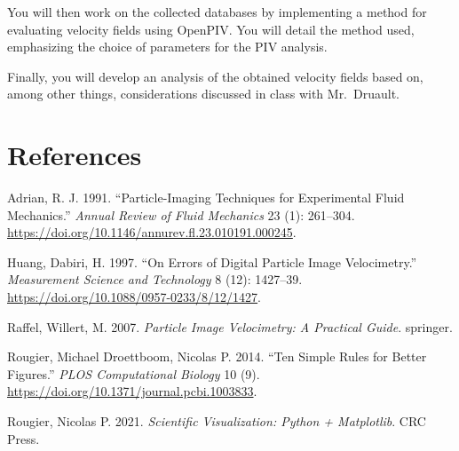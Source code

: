 \documentclass[
  english,
  letterpaper,
  numbers=noendperiod,
  DIV=13]{scrreprt}
\newlength{\cslhangindent}
\newenvironment{CSLReferences}[2] %
 {\begin{list}{}{%
  \setlength{\itemindent}{0pt}
  \setlength{\leftmargin}{0pt}
  \setlength{\parsep}{0pt}
  \ifodd #1
   \setlength{\leftmargin}{\cslhangindent}
   \setlength{\itemindent}{-1\cslhangindent}
  \fi
  \setlength{\itemsep}{#2\baselineskip}}}
 {\end{list}}
\begin{document}
You will then work on the collected databases by implementing a method
for evaluating velocity fields using OpenPIV. You will detail the method
used, emphasizing the choice of parameters for the PIV analysis.

Finally, you will develop an analysis of the obtained velocity fields
based on, among other things, considerations discussed in class with
Mr.~Druault.


\chapter*{References}\label{references}


\label{refs}
\begin{CSLReferences}{1}{0}
Adrian, R. J. 1991. {``Particle-Imaging Techniques for Experimental
Fluid Mechanics.''} \emph{Annual Review of Fluid Mechanics} 23 (1):
261--304. \url{https://doi.org/10.1146/annurev.fl.23.010191.000245}.

Huang, Dabiri, H. 1997. {``On Errors of Digital Particle Image
Velocimetry.''} \emph{Measurement Science and Technology} 8 (12):
1427--39. \url{https://doi.org/10.1088/0957-0233/8/12/1427}.

Raffel, Willert, M. 2007. \emph{Particle Image Velocimetry: A Practical
Guide}. springer.

Rougier, Michael Droettboom, Nicolas P. 2014. {``Ten Simple Rules for
Better Figures.''} \emph{PLOS Computational Biology} 10 (9).
\url{https://doi.org/10.1371/journal.pcbi.1003833}.

Rougier, Nicolas P. 2021. \emph{Scientific Visualization: Python +
Matplotlib}. CRC Press.

\end{CSLReferences}
\end{document}
